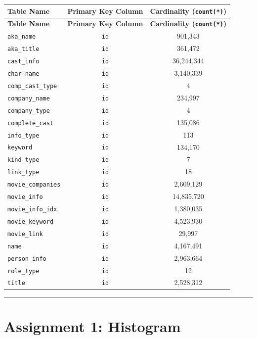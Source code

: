 \documentclass[11pt,a4paper]{article}
\begin{document}
{\begingroup
\small
\setlength{\tabcolsep}{5pt}
\begin{xltabular}{\textwidth}{l | C | C}
\toprule
\textbf{Table Name} & \textbf{Primary Key Column} & \textbf{Cardinality (\texttt{count(*)})} \\
\midrule
\endfirsthead
\toprule
\textbf{Table Name} & \textbf{Primary Key Column} & \textbf{Cardinality (\texttt{count(*)})} \\
\midrule
\endfirsthead
\endhead
\bottomrule
\endfoot
\bottomrule
\endlastfoot
\texttt{aka\_name} & \texttt{id} & 901,343 \\
\texttt{aka\_title} & \texttt{id} & 361,472 \\
\texttt{cast\_info} & \texttt{id} & 36,244,344 \\
\texttt{char\_name} & \texttt{id} & 3,140,339 \\
\texttt{comp\_cast\_type} & \texttt{id} & 4 \\
\texttt{company\_name} & \texttt{id} & 234,997 \\
\texttt{company\_type} & \texttt{id} & 4 \\
\texttt{complete\_cast} & \texttt{id} & 135,086 \\
\texttt{info\_type} & \texttt{id} & 113 \\
\texttt{keyword} & \texttt{id} & 134,170 \\
\texttt{kind\_type} & \texttt{id} & 7 \\
\texttt{link\_type} & \texttt{id} & 18 \\
\texttt{movie\_companies} & \texttt{id} & 2,609,129 \\
\texttt{movie\_info} & \texttt{id} & 14,835,720 \\
\texttt{movie\_info\_idx} & \texttt{id} & 1,380,035 \\
\texttt{movie\_keyword} & \texttt{id} & 4,523,930 \\
\texttt{movie\_link} & \texttt{id} & 29,997 \\
\texttt{name} & \texttt{id} & 4,167,491 \\
\texttt{person\_info} & \texttt{id} & 2,963,664 \\
\texttt{role\_type} & \texttt{id} & 12 \\
\texttt{title} & \texttt{id} & 2,528,312 \\
\end{xltabular}
\endgroup}


\hrule


\section{Assignment 1: Histogram}
\end{document}
